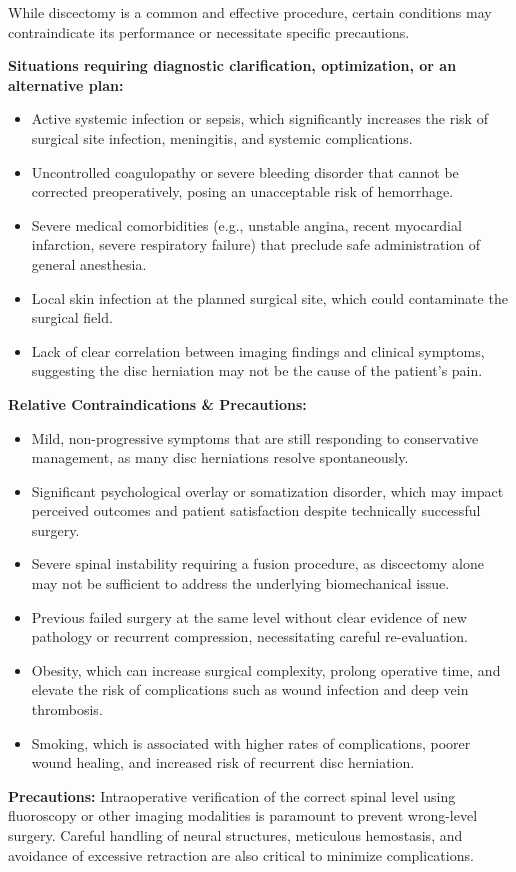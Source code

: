 While discectomy is a common and effective procedure, certain conditions may contraindicate its performance or necessitate specific precautions.

\textbf{Situations requiring diagnostic clarification, optimization, or an alternative plan:}
\begin{itemize}
  \item Active systemic infection or sepsis, which significantly increases the risk of surgical site infection, meningitis, and systemic complications.
  \item Uncontrolled coagulopathy or severe bleeding disorder that cannot be corrected preoperatively, posing an unacceptable risk of hemorrhage.
  \item Severe medical comorbidities (e.g., unstable angina, recent myocardial infarction, severe respiratory failure) that preclude safe administration of general anesthesia.
  \item Local skin infection at the planned surgical site, which could contaminate the surgical field.
  \item Lack of clear correlation between imaging findings and clinical symptoms, suggesting the disc herniation may not be the cause of the patient's pain.
\end{itemize}

\textbf{Relative Contraindications \& Precautions:}
\begin{itemize}
  \item Mild, non-progressive symptoms that are still responding to conservative management, as many disc herniations resolve spontaneously.
  \item Significant psychological overlay or somatization disorder, which may impact perceived outcomes and patient satisfaction despite technically successful surgery.
  \item Severe spinal instability requiring a fusion procedure, as discectomy alone may not be sufficient to address the underlying biomechanical issue.
  \item Previous failed surgery at the same level without clear evidence of new pathology or recurrent compression, necessitating careful re-evaluation.
  \item Obesity, which can increase surgical complexity, prolong operative time, and elevate the risk of complications such as wound infection and deep vein thrombosis.
  \item Smoking, which is associated with higher rates of complications, poorer wound healing, and increased risk of recurrent disc herniation.
\end{itemize}
\textbf{Precautions:} Intraoperative verification of the correct spinal level using fluoroscopy or other imaging modalities is paramount to prevent wrong-level surgery. Careful handling of neural structures, meticulous hemostasis, and avoidance of excessive retraction are also critical to minimize complications.

